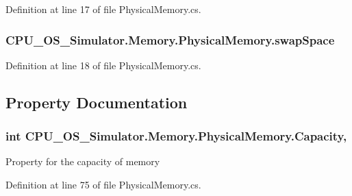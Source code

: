 Definition at line 17 of file Physical\+Memory.\+cs.

\hypertarget{class_c_p_u___o_s___simulator_1_1_memory_1_1_physical_memory_a0dedf020af5760e7c9875e4bcc9f5990}{}
\subsubsection[{swap\+Space}]{ C\+P\+U\+\_\+\+O\+S\+\_\+\+Simulator.\+Memory.\+Physical\+Memory.\+swap\+Space\hspace{0.3cm}{\ttfamily [private]}}\label{class_c_p_u___o_s___simulator_1_1_memory_1_1_physical_memory_a0dedf020af5760e7c9875e4bcc9f5990}


Definition at line 18 of file Physical\+Memory.\+cs.



\subsection{Property Documentation}
\hypertarget{class_c_p_u___o_s___simulator_1_1_memory_1_1_physical_memory_af04d50462367295af1c8b4f9f1a75730}{}
\subsubsection[{Capacity}]{\setlength{\rightskip}{0pt plus 5cm}int C\+P\+U\+\_\+\+O\+S\+\_\+\+Simulator.\+Memory.\+Physical\+Memory.\+Capacity\hspace{0.3cm}{\ttfamily [get]}, {\ttfamily [set]}}\label{class_c_p_u___o_s___simulator_1_1_memory_1_1_physical_memory_af04d50462367295af1c8b4f9f1a75730}


Property for the capacity of memory 



Definition at line 75 of file Physical\+Memory.\+cs.

